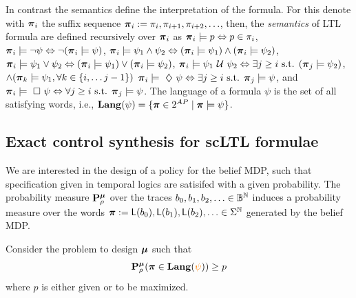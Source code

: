 \documentclass{ifacconf}
\newcommand{\red}[1]{{\color{red} #1}}
\renewcommand{\axx}[1]{{\color{orange} Ali: #1}}
\newcommand{\new}[1]{{\color{blue}#1}}
\newcommand{\cristi}[1]{{\color{orange}#1}}
\begin{document}
In contrast the semantics define the interpretation of the formula. For this denote with  ${\boldsymbol{\pi}}_i$ the suffix sequence  ${\boldsymbol{\pi}}_i:= \pi_i, \pi_{i+1}, \pi_{i+2}, \ldots$, 
     then, the {\em semantics} of LTL  formula are defined recursively  over ${\boldsymbol{\pi}}_i$ as
${\boldsymbol{\pi}}_i \models p   \Leftrightarrow p\in\pi_i$, 
    ${\boldsymbol{\pi}}_i \models \neg \psi  \Leftrightarrow\neg ({\boldsymbol{\pi}}_i \models \psi) $, 
    ${\boldsymbol{\pi}}_i \models \psi_1 \wedge  \psi_2   \Leftrightarrow  ( {\boldsymbol{\pi}}_i \models \psi_1 ) \wedge ( {\boldsymbol{\pi}}_i \models \psi_2 ) $, 
    ${\boldsymbol{\pi}}_i \models \psi_1 \vee  \psi_2   \Leftrightarrow  ( {\boldsymbol{\pi}}_i \models \psi_1 ) \vee ( {\boldsymbol{\pi}}_i \models \psi_2 ) $, 
    ${\boldsymbol{\pi}}_i \models  \psi_1 \ \mathcal{U}\  \psi_2  \Leftrightarrow \exists j \geq i \text{ s.t. } ({\boldsymbol{\pi}}_j \models \psi_2 ) $, 
    $  \wedge ({\boldsymbol{\pi}}_k \models \psi_1, \forall k \in \{i, \ldots j-1\})$
    ${\boldsymbol{\pi}}_i \models \ \diamondsuit\  \psi   \Leftrightarrow \exists j \geq i \text{ s.t. }{\boldsymbol{\pi}}_j \models \psi $, and 
    ${\boldsymbol{\pi}}_i \models \ \square\  \psi   \Leftrightarrow  \forall j \geq i \text{ s.t. }{\boldsymbol{\pi}}_j \models \psi$.
\cristi{The language of a formula $\psi$ is the set of all satisfying words,
i.e., $\mathbf{Lang}(\psi) = \{{\boldsymbol{\pi}} \in 2^{AP} \mid {\boldsymbol{\pi}} \models \psi\}$.}


 




\subsection{Exact control synthesis for scLTL formulae}
We are interested in the design of a policy for the belief MDP, such that specification given in temporal logics are satisifed with a given probability. 
\new{
The probability measure $\mathbf{P}_\rho^{\boldsymbol{\mu}}$ over the traces $b_0, b_1, b_2, \ldots\in \mathbb{B}^{\mathbb N}$ induces a probability measure over the words ${\boldsymbol{\pi}}:= \mathsf{L}(b_0), \mathsf{L}(b_1), \mathsf{L}(b_2), \ldots\in \Sigma^{\mathbb N}$ generated by the belief MDP.}

Consider the problem to design ${\boldsymbol{\mu}}$ such that  
\[\P_\init^\polb
(\word \in\Language (\cristi{\psi}))\geq p\]
where $p$ is either given or to be maximized.
\end{document}
